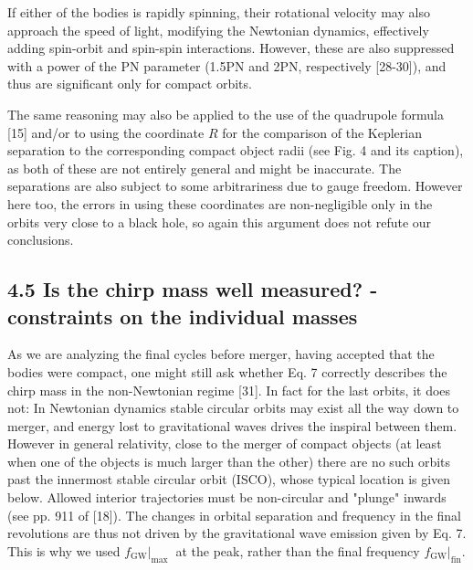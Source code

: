 \documentclass[10pt]{article}
\begin{document}
If either of the bodies is rapidly spinning, their rotational velocity may also approach the speed of light, modifying the Newtonian dynamics, effectively adding spin-orbit and spin-spin interactions. However, these are also suppressed with a power of the PN parameter (1.5PN and 2PN, respectively [28-30]), and thus are significant only for compact orbits.

The same reasoning may also be applied to the use of the quadrupole formula [15] and/or to using the coordinate $R$ for the comparison of the Keplerian separation to the corresponding compact object radii (see Fig. 4 and its caption), as both of these are not entirely general and might be inaccurate. The separations are also subject to some arbitrariness due to gauge freedom. However here too, the errors in using these coordinates are non-negligible only in the orbits very close to a black hole, so again this argument does not refute our conclusions.

\subsection*{4.5 Is the chirp mass well measured? - constraints on the individual masses}
As we are analyzing the final cycles before merger, having accepted that the bodies were compact, one might still ask whether Eq. 7 correctly describes the chirp mass in the non-Newtonian regime [31]. In fact for the last orbits, it does not: In Newtonian dynamics stable circular orbits may exist all the way down to merger, and energy lost to gravitational waves drives the inspiral between them. However in general relativity, close to the merger of compact objects (at least when one of the objects is much larger than the other) there are no such orbits past the innermost stable circular orbit (ISCO), whose typical location is given below. Allowed interior trajectories must be non-circular and "plunge" inwards (see pp. 911 of [18]). The changes in orbital separation and frequency in the final revolutions are thus not driven by the gravitational wave emission given by Eq. 7. This is why we used $\left.f_{\mathrm{GW}}\right|_{\text {max }}$ at the peak, rather than the final frequency $\left.f_{\mathrm{GW}}\right|_{\mathrm{fin}}$.
\end{document}

